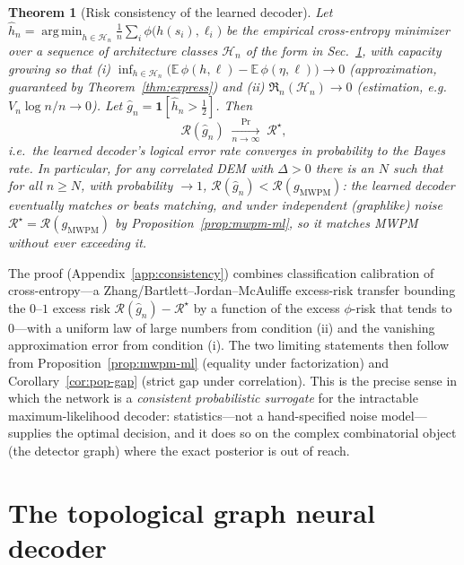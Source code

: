 \documentclass[aps,prxquantum,twocolumn,superscriptaddress,nofootinbib,longbibliography]{revtex4-2}
\newtheorem{theorem}{Theorem}
\DeclareMathOperator*{\argmin}{arg\,min}
\newcommand{\E}{\mathbb{E}}
\newcommand{\PR}{\mathrm{Pr}}
\newcommand{\ind}[1]{\mathbf{1}\!\left[#1\right]}
\newcommand{\cH}{\mathcal{H}}
\newcommand{\Risk}{\mathcal{R}}
\newcommand{\Rad}{\mathfrak{R}}
\begin{document}
\begin{theorem}[Risk consistency of the learned decoder]
\label{thm:consistency}
Let $\hat h_n=\argmin_{h\in\cH_n}\frac1n\sum_i\phi\big(h(s_i),\ell_i\big)$ be the
empirical cross-entropy minimizer over a sequence of architecture classes
$\cH_n$ of the form in Sec.~\ref{sec:method}, with capacity growing so that
(i) $\inf_{h\in\cH_n}\big(\E\,\phi(h,\ell)-\E\,\phi(\eta,\ell)\big)\to 0$
(approximation, guaranteed by Theorem~\ref{thm:express}) and
(ii) $\Rad_n(\cH_n)\to 0$ (estimation, e.g.\ $V_n\log n/n\to 0$). Let
$\hat g_n=\ind{\hat h_n>\tfrac12}$. Then
\begin{equation}
  \Risk(\hat g_n)\;\xrightarrow[n\to\infty]{\PR}\;\Risk^\star ,
\end{equation}
i.e.\ the learned decoder's logical error rate converges in probability to the
Bayes rate. In particular, for any correlated DEM with $\Delta>0$ there is an
$N$ such that for all $n\ge N$, with probability $\to 1$,
$\Risk(\hat g_n)<\Risk(g_{\mathrm{MWPM}})$: the learned decoder eventually
matches or beats matching, and under independent (graphlike) noise
$\Risk^\star=\Risk(g_{\mathrm{MWPM}})$ by Proposition~\ref{prop:mwpm-ml}, so it
matches MWPM without ever exceeding it.
\end{theorem}

The proof (Appendix~\ref{app:consistency}) combines classification calibration of
cross-entropy---a Zhang/Bartlett--Jordan--McAuliffe excess-risk transfer bounding
the $0$--$1$ excess risk $\Risk(\hat g_n)-\Risk^\star$ by a function of the excess
$\phi$-risk that tends to $0$---with a uniform law of large numbers from
condition (ii) and the vanishing approximation error from condition (i). The two
limiting statements then follow from Proposition~\ref{prop:mwpm-ml} (equality
under factorization) and Corollary~\ref{cor:pop-gap} (strict gap under
correlation). This is the precise sense in which the network is a
\emph{consistent probabilistic surrogate} for the intractable maximum-likelihood
decoder: statistics---not a hand-specified noise model---supplies the optimal
decision, and it does so on the complex combinatorial object (the detector graph)
where the exact posterior is out of reach.

\section{The topological graph neural decoder}
\label{sec:method}
\end{document}
